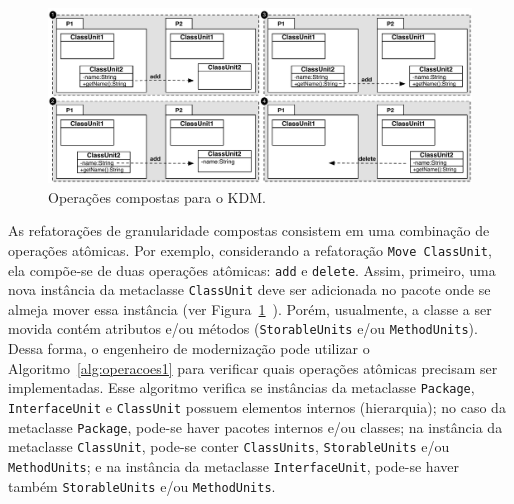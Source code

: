 \begin{figure}[h]
	\centering
	\caption{Operações compostas para o KDM.}
	\label{fig:operacoes_compostas_figuras}
	\includegraphics[scale=0.63]{images/moveNested}
	\fautor
\end{figure}

\begin{algoritmo}[h]
     \SetAlgoLined
     \caption{Algoritmo para criar refatorações compostas DFS.}
     \label{alg:operacoes1}
   \end{algoritmo}

As refatorações de granularidade compostas consistem em uma combinação de operações atômicas. Por exemplo, considerando a refatoração \texttt{Move ClassUnit}, ela compõe-se de duas operações atômicas: \texttt{add} e \texttt{delete}. Assim, primeiro, uma nova instância da metaclasse \texttt{ClassUnit} deve ser adicionada no pacote onde se almeja mover essa instância (ver Figura~\ref{fig:operacoes_compostas_figuras}~). Porém, usualmente, a classe a ser movida contém atributos e/ou métodos (\texttt{StorableUnits} e/ou \texttt{MethodUnits}). Dessa forma, o engenheiro de modernização pode utilizar o Algoritmo~\ref{alg:operacoes1} para verificar quais operações atômicas precisam ser implementadas. Esse algoritmo verifica se instâncias da metaclasse \texttt{Package}, \texttt{InterfaceUnit} e \texttt{ClassUnit} possuem elementos internos (hierarquia); no caso da metaclasse \texttt{Package}, pode-se haver pacotes internos e/ou classes; na instância da metaclasse \texttt{ClassUnit}, pode-se conter \texttt{ClassUnits}, \texttt{StorableUnits} e/ou \texttt{MethodUnits}; e na instância da metaclasse \texttt{InterfaceUnit}, pode-se haver também \texttt{StorableUnits} e/ou \texttt{MethodUnits}. 

